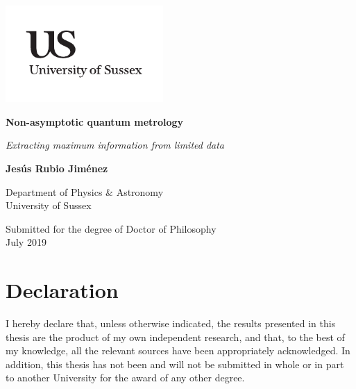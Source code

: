 \documentclass[a4paper,12pt,oneside]{report}
\newcommand\blankpage{
    \null
    \thispagestyle{empty}
    \newpage}
\begin{document}

\thispagestyle{empty}
\begin{flushright}
\includegraphics[width=6cm]{us_logo}
\end{flushright}	
\vskip40mm
\begin{center}

\LARGE\textbf{Non-asymptotic quantum metrology}
\vskip2mm

\Large\textit{Extracting maximum information from limited data}
\vskip10mm

\Large
\textbf{Jes\'{u}s Rubio Jim\'{e}nez}
\normalsize

\large
\vskip30mm
Department of Physics \& Astronomy \\
\vskip4mm
University of Sussex \\
\end{center}
\vfill
\begin{flushleft}
\large

Submitted for the degree of Doctor of Philosophy \\

July 2019
\end{flushleft}		


\chapter*{\vspace{-1cm}Declaration}
I hereby declare that, unless otherwise indicated, the results presented in this thesis are the product of my own independent research, and that, to the best of my knowledge, all the relevant sources have been appropriately acknowledged. In addition, this thesis has not been and will not be submitted in whole or in part to another University for the award of any other degree.
\end{document}
